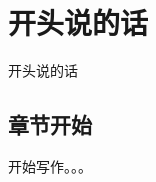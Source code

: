 \documentclass[11pt,oneside]{book}
\begin{document}
\frontmatter

\author{作者}
\mytitle

\chapter*{开头说的话}
\begin{common-format}
开头说的话


\end{common-format}


\setcounter{tocdepth}{1}
\tableofcontents

\begin{common-format}
\mainmatter

\chapter{章节开始}

开始写作。。。





\end{common-format}
\end{document}
